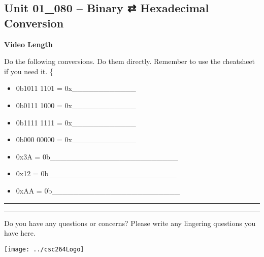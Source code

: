 \documentclass[letterpaper,12pt]{exam}
\newcommand{\unit}{Unit 01}
\begin{document}
\begin{questions}
\section*{\unit\_080 -- Binary ⇄ Hexadecimal Conversion}
\par{\selectfont\textbf{Video Length }}
\begin{samepage}
    \question Do the following conversions.  Do them directly.  Remember to use the cheatsheet if you need it.
    \{\begin{itemize}
      \item  0b1011 1101 = 0x\_\_\_\_\_\_\_\_\_\_\_\_\\
      \item  0b0111 1000 = 0x\_\_\_\_\_\_\_\_\_\_\_\_\\
      \item  0b1111 1111 = 0x\_\_\_\_\_\_\_\_\_\_\_\_\\
      \item  0b000 00000 = 0x\_\_\_\_\_\_\_\_\_\_\_\_
      \item  0x3A = 0b\_\_\_\_\_\_\_\_\_\_\_\_\_\_\_\_\_\_\_\_\_\_\_\_\\
      \item  0x12 = 0b\_\_\_\_\_\_\_\_\_\_\_\_\_\_\_\_\_\_\_\_\_\_\_\_\\
      \item  0xAA = 0b\_\_\_\_\_\_\_\_\_\_\_\_\_\_\_\_\_\_\_\_\_\_\_\_\\
    \end{itemize}
\end{samepage}

\rule{0.5\textwidth}{.4pt} %
\begin{center}
    \rule{0.5\textwidth}{.4pt}
\end{center}
Do you have any questions or concerns? Please write any lingering questions you have here.

\end{questions}
\vfill
\begin{center}
\texttt{[image: ../csc264Logo]}
\end{center}
\end{document}
